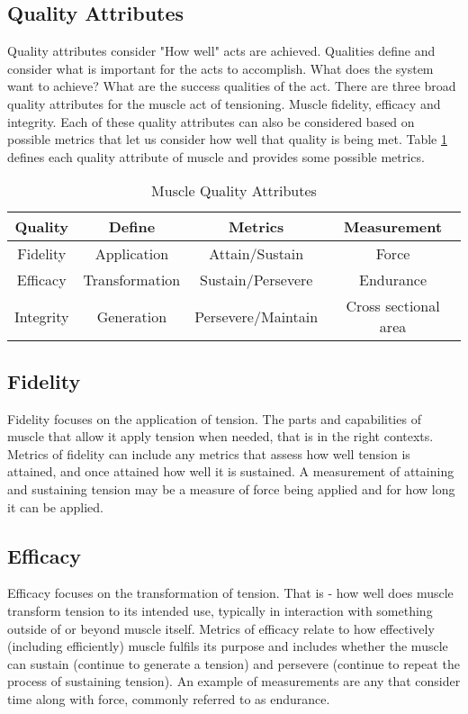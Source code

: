 \subsection{Quality Attributes}

Quality attributes consider "How well" acts are achieved. Qualities define and consider what is important for the acts to accomplish. What does the system want to achieve? What are the success qualities of the act. There are three broad quality attributes for the muscle act of tensioning. Muscle fidelity, efficacy and integrity. Each of these quality attributes can also be considered based on possible metrics that let us consider how well that quality is being met. Table \ref{table:1} defines each quality attribute of muscle and provides some possible metrics.

\begin{table}[h!]
\centering
\begin{tabular}{||c c c c||} 
 \hline
 Quality & Define & Metrics & Measurement \\ [0.5ex] 
 \hline\hline
 Fidelity & Application & Attain/Sustain & Force \\ 
 Efficacy & Transformation & Sustain/Persevere & Endurance \\
 Integrity & Generation & Persevere/Maintain & Cross sectional area \\[1ex] 
 \hline
\end{tabular}
\caption{Muscle Quality Attributes}
\label{table:1}
\end{table}

\subsection{Fidelity}
Fidelity focuses on the application of tension. The parts and capabilities of muscle that allow it apply tension when needed, that is in the right contexts. Metrics of fidelity can include any metrics that assess how well tension is attained, and once attained how well it is sustained. A measurement of attaining and sustaining tension may be a measure of force being applied and for how long it can be applied.

\subsection{Efficacy}
Efficacy focuses on the transformation of tension. That is - how well does muscle transform tension to its intended use, typically in interaction with something outside of or beyond muscle itself. Metrics of efficacy relate to how effectively (including efficiently) muscle fulfils its purpose and includes whether the muscle can sustain (continue to generate a tension) and persevere (continue to repeat the process of sustaining tension). An example of measurements are any that consider time along with force, commonly referred to as endurance. 

